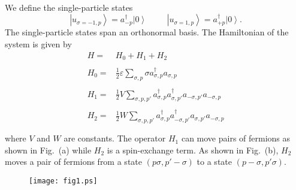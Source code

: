 \documentclass[11pt,a4wide]{article}
\newcommand{\ket}[1]{\left| #1 \right\rangle}
\begin{document}
We define the single-particle states
\[
\ket{u_{\sigma =-1,p}}=a_{-p}^{\dagger}\ket{0}
\hspace{1cm}
\ket{u_{\sigma =1,p}}=a_{+p}^{\dagger}\ket{0}.
\]
The single-particle states span an orthonormal basis.
The Hamiltonian of the system is given by
\[
\begin{array}{ll}
H=&H_{0}+H_{1}+H_{2}\\
&\\
H_{0}=&\frac{1}{2}\varepsilon\sum_{\sigma ,p}\sigma
a_{\sigma,p}^{\dagger}a_{\sigma ,p}\\
&\\
H_{1}=&\frac{1}{2}V\sum_{\sigma ,p,p'}
a_{\sigma,p}^{\dagger}a_{\sigma ,p'}^{\dagger}
a_{-\sigma ,p'}a_{-\sigma ,p}\\
&\\
H_{2}=&\frac{1}{2}W\sum_{\sigma ,p,p'}
a_{\sigma,p}^{\dagger}a_{-\sigma ,p'}^{\dagger}
a_{\sigma ,p'}a_{-\sigma ,p}\\
&\\
\end{array}
\]
where $V$ and $W$ are constants. The operator 
$H_{1}$ can move pairs of fermions as shown in Fig.~(a)
while $H_{2}$ is a spin-exchange term.
As shown in Fig.~(b),
$H_{2}$ moves a pair of fermions from a state $(p\sigma ,p' -\sigma)$ to a state
$(p-\sigma ,p'\sigma)$.
\begin{figure}[hbtp]
\texttt{[image: fig1.ps]}
\end{figure}\newline
\end{document}
